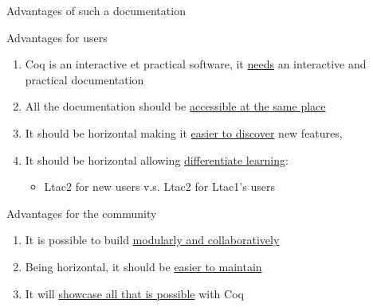 \documentclass[10pt]{beamer}
\begin{document}
\begin{frame}{Advantages of such a documentation}
  \begin{tcbSol}{Advantages for users}
    \begin{enumerate}
      \item<1-> Coq is an interactive et practical software, it \ul{needs} an
            interactive and practical documentation
      \item<2-> All the documentation should be \ul{accessible at the same place}
      \item<3-> It should be horizontal making it \ul{easier to discover} new features,
      \item<4-> It should be horizontal allowing \ul{differentiate learning}:
      \begin{itemize}[label=$\hookrightarrow$]
        \item Ltac2 for new users\;  v.s.  \;Ltac2 for Ltac1's users
      \end{itemize}
    \end{enumerate}
  \end{tcbSol}
  \begin{tcbSol}{Advantages for the community}
    \begin{enumerate}
      \item<5-> It is possible to build \ul{modularly and collaboratively}
      \item<6-> Being horizontal, it should be \ul{easier to maintain}
      \item<7-> It will \ul{showcase all that is possible} with Coq
    \end{enumerate}
  \end{tcbSol}
\end{frame}
\end{document}
